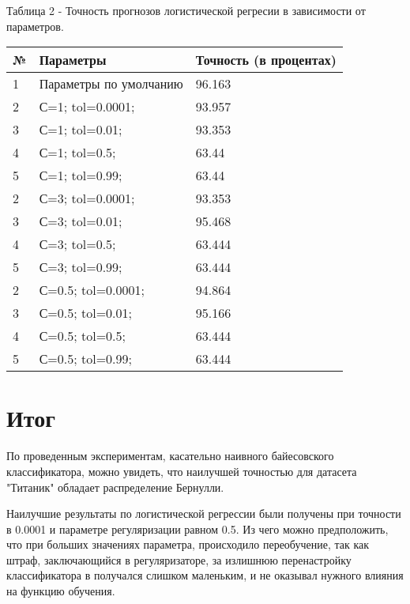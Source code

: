 \documentclass[a4paper,12pt]{article}
\begin{document}
	\vspace{0.5cm}
	Таблица 2 - Точность прогнозов логистической регресии в зависимости от параметров.
\begin{longtable}{|p{1cm}|p{9cm}|p{3cm}|}
\hline 
№ & Параметры & Точность (в процентах) \\ 
\hline 
1 & Параметры по умолчанию & 96.163 \\
\hline
2 & С=1; tol=0.0001; & 93.957 \\
\hline 
3 & С=1; tol=0.01; & 93.353 \\
\hline 
4 &  С=1; tol=0.5;  & 63.44 \\
\hline 
5 & С=1; tol=0.99;  & 63.44 \\
\hline
2 & С=3; tol=0.0001; & 93.353 \\
\hline 
3 & С=3; tol=0.01; & 95.468 \\
\hline 
4 &  С=3; tol=0.5;  & 63.444 \\
\hline 
5 & С=3; tol=0.99;  & 63.444 \\
\hline
2 & С=0.5; tol=0.0001; & 94.864 \\
\hline 
3 & С=0.5; tol=0.01; & 95.166 \\
\hline 
4 & С=0.5; tol=0.5;  & 63.444 \\
\hline 
5 & С=0.5; tol=0.99;  & 63.444 \\
\hline 
\end{longtable}


\newpage\section{Итог}
	По проведенным экспериментам, касательно наивного байесовского классификатора, можно увидеть, что наилучшей точностью для датасета "Титаник" обладает распределение Бернулли.
	
	\vspace{0.5cm}
	Наилучшие результаты по логистической регрессии были получены при точности в 0.0001 и параметре регуляризации равном 0.5. Из чего можно предположить, что при больших значениях параметра, происходило переобучение, так как штраф, заключающийся в регуляризаторе, за излишнюю перенастройку классификатора в получался слишком маленьким, и не оказывал нужного влияния на функцию обучения.
\end{document}

